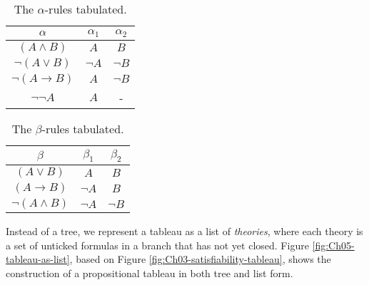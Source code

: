 \begin{table}[H]
    \centering
    \begin{tabular}{|c|cc|}
        \hline
        \(\alpha\) & \(\alpha_1\) & \(\alpha_2\)\\
        \hline
        \((A\land B)\) & \(A\) & \(B\)\\
        \hline
        \(\neg(A\lor B)\) & \(\neg A\) & \(\neg B\)\\
        \hline
        \(\neg(A\rightarrow B)\) & \(A\) & \(\neg B\)\\
        \hline
        \(\neg\neg A\) & \(A\) & -\\
        \hline
    \end{tabular}

    \caption{The \(\alpha\)-rules tabulated.}
    \label{tab:Ch05-alpha-rules}
\end{table}

\begin{table}[H]
    \centering
    \begin{tabular}{|c|cc|}
        \hline
        \(\beta\) & \(\beta_1\) & \(\beta_2\)\\
        \hline
        \((A\lor B)\) & \(A\) & \(B\)\\
        \hline
        \((A\rightarrow B)\) & \(\neg A\) & \(B\)\\
        \hline
        \(\neg(A\land B)\) & \(\neg A\) & \(\neg B\)\\
        \hline
    \end{tabular}

    \caption{The \(\beta\)-rules tabulated.}
    \label{tab:Ch05-beta-rules}
\end{table}


Instead of a tree, we represent a tableau as a list of \emph{theories}, where each theory is a set of unticked formulas in a branch that has not yet closed. Figure \ref{fig:Ch05-tableau-as-list}, based on Figure \ref{fig:Ch03-satisfiability-tableau}, shows the construction of a propositional tableau in both tree and list form.


